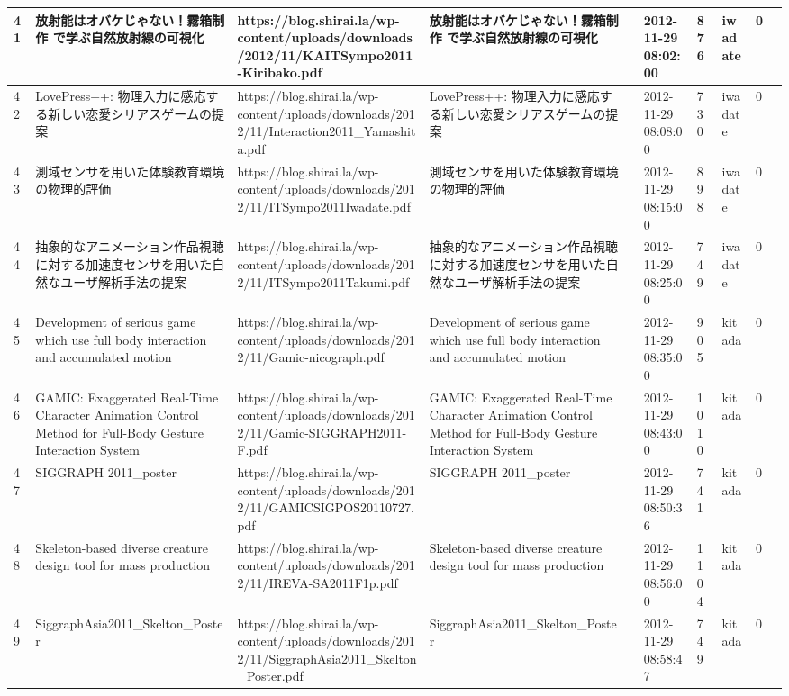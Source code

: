 \begin{longtable}{|l|l|l|l|l|l|l|l|l|l|}
41 & 放射能はオバケじゃない！霧箱制作 で学ぶ自然放射線の可視化 & https://blog.shirai.la/wp-content/uploads/downloads/2012/11/KAITSympo2011-Kiribako.pdf & 放射能はオバケじゃない！霧箱制作 で学ぶ自然放射線の可視化 &  & 2012-11-29 08:02:00 & 876 & iwadate & 0 &  \\ \hline 
42 & LovePress++: 物理入力に感応する新しい恋愛シリアスゲームの提案 & https://blog.shirai.la/wp-content/uploads/downloads/2012/11/Interaction2011\_Yamashita.pdf & LovePress++: 物理入力に感応する新しい恋愛シリアスゲームの提案 &  & 2012-11-29 08:08:00 & 730 & iwadate & 0 &  \\ \hline 
43 & 測域センサを用いた体験教育環境の物理的評価 & https://blog.shirai.la/wp-content/uploads/downloads/2012/11/ITSympo2011Iwadate.pdf & 測域センサを用いた体験教育環境の物理的評価 &  & 2012-11-29 08:15:00 & 898 & iwadate & 0 &  \\ \hline 
44 & 抽象的なアニメーション作品視聴に対する加速度センサを用いた自然なユーザ解析手法の提案 & https://blog.shirai.la/wp-content/uploads/downloads/2012/11/ITSympo2011Takumi.pdf & 抽象的なアニメーション作品視聴に対する加速度センサを用いた自然なユーザ解析手法の提案 &  & 2012-11-29 08:25:00 & 749 & iwadate & 0 &  \\ \hline 
45 & Development of serious game which use full body interaction and accumulated motion & https://blog.shirai.la/wp-content/uploads/downloads/2012/11/Gamic-nicograph.pdf & Development of serious game which use full body interaction and accumulated motion &  & 2012-11-29 08:35:00 & 905 & kitada & 0 &  \\ \hline 
46 & GAMIC: Exaggerated Real-Time Character Animation Control Method for Full-Body Gesture Interaction System & https://blog.shirai.la/wp-content/uploads/downloads/2012/11/Gamic-SIGGRAPH2011-F.pdf & GAMIC: Exaggerated Real-Time Character Animation Control Method for Full-Body Gesture Interaction System &  & 2012-11-29 08:43:00 & 1010 & kitada & 0 &  \\ \hline 
47 & SIGGRAPH 2011\_poster & https://blog.shirai.la/wp-content/uploads/downloads/2012/11/GAMICSIGPOS20110727.pdf & SIGGRAPH 2011\_poster &  & 2012-11-29 08:50:36 & 741 & kitada & 0 &  \\ \hline 
48 & Skeleton-based diverse creature design tool for mass production & https://blog.shirai.la/wp-content/uploads/downloads/2012/11/IREVA-SA2011F1p.pdf & Skeleton-based diverse creature design tool for mass production &  & 2012-11-29 08:56:00 & 1104 & kitada & 0 &  \\ \hline 
49 & SiggraphAsia2011\_Skelton\_Poster & https://blog.shirai.la/wp-content/uploads/downloads/2012/11/SiggraphAsia2011\_Skelton\_Poster.pdf & SiggraphAsia2011\_Skelton\_Poster &  & 2012-11-29 08:58:47 & 749 & kitada & 0 &  \\ \hline 

\end{longtable}

